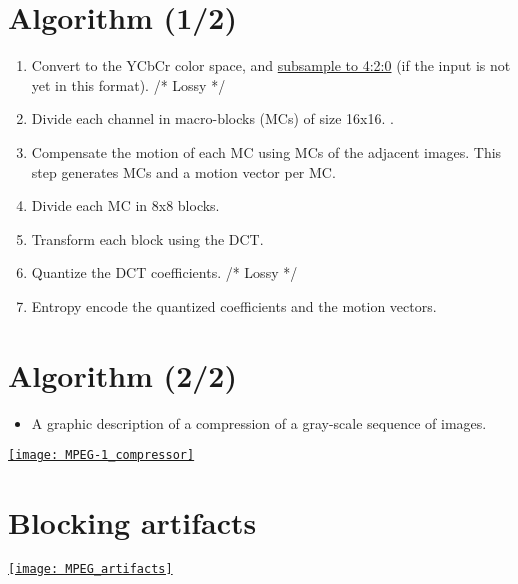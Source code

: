 \section{Algorithm (1/2)}
\begin{enumerate}
\item Convert to the \gls{YCbCr} color space, and
  \href{https://en.wikipedia.org/wiki/Chroma_subsampling}{subsample to
    4:2:0} (if the input is not yet in this format). /* Lossy */
\item Divide each channel in macro-blocks (MCs) of size 16x16. .
\item Compensate the motion of each MC using MCs of the adjacent
  images. This step generates  MCs and a motion
  vector per MC.
\item Divide each MC in 8x8 blocks.
\item Transform each block using the \gls{DCT}.
\item Quantize the \gls{DCT} coefficients. /* Lossy */
\item Entropy encode the quantized coefficients and the motion
  vectors.
\end{enumerate}

\section*{Algorithm (2/2)}
\begin{itemize}
\item A graphic description of a compression of a gray-scale sequence of images.
\end{itemize}
\vspace{-2ex}
\begin{center}
  \href{https://w3.ual.es/~vruiz/Docencia/Apuntes/Coding/Video/02-MPEG1/index.html}{\texttt{[image: MPEG-1\_compressor]}}
\end{center}

\section{Blocking artifacts}
\begin{center}
  \href{https://filmora.wondershare.com/video-editing/video-compression-artifacts.html}{\texttt{[image: MPEG\_artifacts]}}
\end{center}
